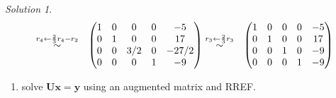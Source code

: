 \documentclass[
]{book}
\providecommand{\tightlist}{%
  \setlength{\itemsep}{0pt}\setlength{\parskip}{0pt}}
\theoremstyle{definition}
\theoremstyle{definition}
\theoremstyle{definition}
\theoremstyle{definition}
\theoremstyle{remark}
\newtheorem*{solution}{Solution}
\begin{document}
\begin{solution}
\[\begin{aligned}
& \stackrel{r_4 \leftarrow \frac{2}{3} r_4 - r_2}{\huge \sim} & \begin{pmatrix} 1 & 0 & 0 & 0 & -5 \\ 0 & 1 & 0 & 0 & 17 \\ 0 & 0 & 3/2 & 0 & -27/2 \\ 0 & 0 & 0 & 1 & -9 \end{pmatrix} & \stackrel{r_3 \leftarrow \frac{2}{3} r_3}{\huge \sim} & \begin{pmatrix} 1 & 0 & 0 & 0 & -5 \\ 0 & 1 & 0 & 0 & 17 \\ 0 & 0 & 1 & 0 & -9 \\ 0 & 0 & 0 & 1 & -9 \end{pmatrix}
\end{aligned}
\]

\begin{enumerate}
\def\labelenumi{\arabic{enumi})}
\setcounter{enumi}{1}
\tightlist
\item
  solve \(\mathbf{U} \mathbf{x} = \mathbf{y}\) using an augmented matrix and RREF.
\end{enumerate}


\end{solution}
\end{document}
